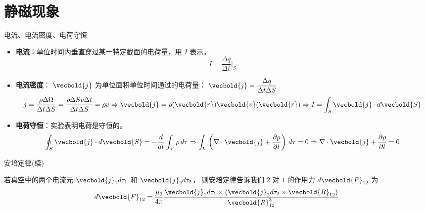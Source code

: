 \section{静磁现象}
\begin{defn}
    电流、电流密度、电荷守恒
\begin{itemize}
    \item \textbf{电流}：单位时间内垂直穿过某一特定截面的电荷量，用 \( I \) 表示。
    \[I = \frac{\Delta q}{\Delta t} \bigg|_S\]
    \item \textbf{电流密度}： \( \vecbold{j} \) 为单位面积单位时间通过的电荷量：
    \(\displaystyle \vecbold{j} = \frac{\Delta q}{\Delta t \Delta S}\)
\[
j = \frac{\rho \Delta \Omega}{\Delta t \Delta S} 
= \frac{\rho \Delta S v \Delta t}{\Delta t \Delta S} = \rho v
\Rightarrow \vecbold{j} = \rho(\vecbold{r}) \vecbold{v}(\vecbold{r}) 
\Rightarrow I = \int_S \vecbold{j} \cdot d\vecbold{S}
\]
\item \textbf{电荷守恒}：实验表明电荷是守恒的。
\[
\oint_{S} \vecbold{j} \cdot d\vecbold{S} 
= -\frac{d}{dt} \int_{V} \rho \, d\tau
\Rightarrow \int_V\left(\nabla\cdot \vecbold{j}
+\frac{\pa \rho}{\pa t}\right)\,d\tau =0
\Rightarrow \nabla\cdot \vecbold{j}+\frac{\pa \rho}{\pa t}=0
\]
\end{itemize}
\end{defn}
\begin{law}
    安培定律(续)
    
    若真空中的两个电流元 \(\vecbold{j}_1 d \tau_1\) 和 \(\vecbold{j}_2 d \tau_2\)，
    则安培定律告诉我们 \(2\) 对 \(1\) 的作用力 \(d \vecbold{F}_{12}\) 为
\[
d \vecbold{F}_{12} = \frac{\mu_0}{4 \pi} \frac{\vecbold{j}_1 d \tau_1 \times (\vecbold{j}_2 d \tau_2 \times \vecbold{R}_{12})}{\vecbold{R}_{12}^3}
\]
\end{law}
